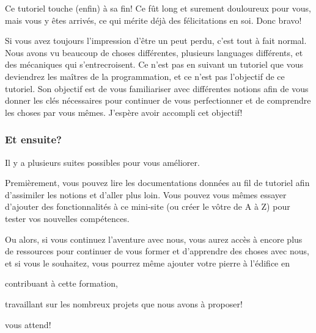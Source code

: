 \documentclass[internal]{nhitec_design}
\begin{document}
Ce tutoriel touche (enfin) à sa fin! Ce fût long et surement douloureux pour vous, mais vous y êtes arrivés, ce qui mérite déjà des félicitations en soi. Donc bravo!

Si vous avez toujours l'impression d'être un peut perdu, c'est tout à fait normal. Nous avons vu beaucoup de choses différentes, plusieurs languages différents, et des mécaniques qui s'entrecroisent. Ce n'est pas en suivant un tutoriel que vous deviendrez les maîtres de la programmation, et ce n'est pas l'objectif de ce tutoriel. Son objectif est de vous familiariser avec différentes notions afin de vous donner les clés nécessaires pour continuer de vous perfectionner et de comprendre les choses par vous mêmes. J'espère avoir accompli cet objectif!

\subsubsection{Et ensuite?}

Il y a plusieurs suites possibles pour vous améliorer. 

Premièrement, vous pouvez lire les documentations données au fil de tutoriel afin d'assimiler les notions et d'aller plus loin. Vous pouvez vous mêmes essayer d'ajouter des fonctionnalités à ce mini-site (ou créer le vôtre de A à Z) pour tester vos nouvelles compétences.

Ou alors, si vous continuez l'aventure \nhitec{} avec nous, vous aurez accès à encore plus de ressources pour continuer de vous former et d'apprendre des choses avec nous, et si vous le souhaitez, vous pourrez même ajouter votre pierre à l'édifice en 
\begin{enumerate*} [1)]
    \item contribuant à cette formation,
    \item travaillant sur les nombreux projets que nous avons à proposer!
\end{enumerate*}

\nhitec{} vous attend!
\end{document}
